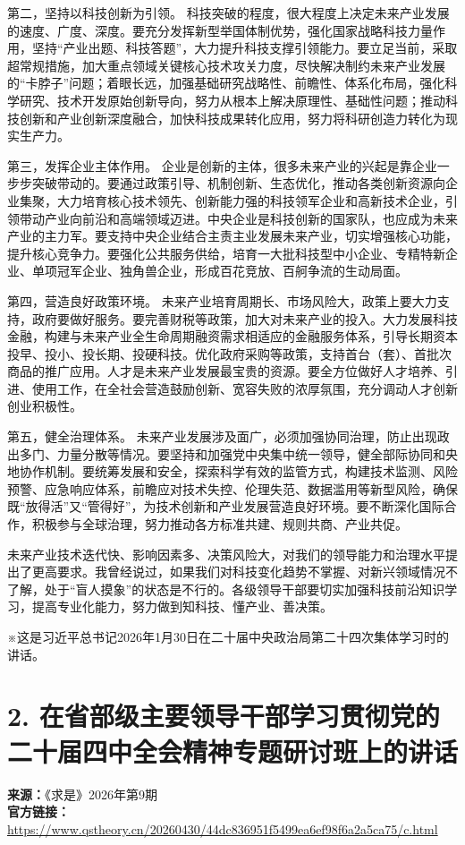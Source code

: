 \documentclass[UTF8,zihao=-4]{ctexart}
\begin{document}
第二，坚持以科技创新为引领。 科技突破的程度，很大程度上决定未来产业发展的速度、广度、深度。要充分发挥新型举国体制优势，强化国家战略科技力量作用，坚持“产业出题、科技答题”，大力提升科技支撑引领能力。要立足当前，采取超常规措施，加大重点领域关键核心技术攻关力度，尽快解决制约未来产业发展的“卡脖子”问题；着眼长远，加强基础研究战略性、前瞻性、体系化布局，强化科学研究、技术开发原始创新导向，努力从根本上解决原理性、基础性问题；推动科技创新和产业创新深度融合，加快科技成果转化应用，努力将科研创造力转化为现实生产力。

第三，发挥企业主体作用。 企业是创新的主体，很多未来产业的兴起是靠企业一步步突破带动的。要通过政策引导、机制创新、生态优化，推动各类创新资源向企业集聚，大力培育核心技术领先、创新能力强的科技领军企业和高新技术企业，引领带动产业向前沿和高端领域迈进。中央企业是科技创新的国家队，也应成为未来产业的主力军。要支持中央企业结合主责主业发展未来产业，切实增强核心功能，提升核心竞争力。要强化公共服务供给，培育一大批科技型中小企业、专精特新企业、单项冠军企业、独角兽企业，形成百花竞放、百舸争流的生动局面。

第四，营造良好政策环境。 未来产业培育周期长、市场风险大，政策上要大力支持，政府要做好服务。要完善财税等政策，加大对未来产业的投入。大力发展科技金融，构建与未来产业全生命周期融资需求相适应的金融服务体系，引导长期资本投早、投小、投长期、投硬科技。优化政府采购等政策，支持首台（套）、首批次商品的推广应用。人才是未来产业发展最宝贵的资源。要全方位做好人才培养、引进、使用工作，在全社会营造鼓励创新、宽容失败的浓厚氛围，充分调动人才创新创业积极性。

第五，健全治理体系。 未来产业发展涉及面广，必须加强协同治理，防止出现政出多门、力量分散等情况。要坚持和加强党中央集中统一领导，健全部际协同和央地协作机制。要统筹发展和安全，探索科学有效的监管方式，构建技术监测、风险预警、应急响应体系，前瞻应对技术失控、伦理失范、数据滥用等新型风险，确保既“放得活”又“管得好”，为技术创新和产业发展营造良好环境。要不断深化国际合作，积极参与全球治理，努力推动各方标准共建、规则共商、产业共促。

未来产业技术迭代快、影响因素多、决策风险大，对我们的领导能力和治理水平提出了更高要求。我曾经说过，如果我们对科技变化趋势不掌握、对新兴领域情况不了解，处于“盲人摸象”的状态是不行的。各级领导干部要切实加强科技前沿知识学习，提高专业化能力，努力做到知科技、懂产业、善决策。

※这是习近平总书记2026年1月30日在二十届中央政治局第二十四次集体学习时的讲话。

\clearpage
\section*{2. 在省部级主要领导干部学习贯彻党的二十届四中全会精神专题研讨班上的讲话}
\noindent\textbf{来源：}《求是》2026年第9期\\
\noindent\textbf{官方链接：}
\noindent\url{https://www.qstheory.cn/20260430/44dc836951f5499ea6ef98f6a2a5ca75/c.html}
\end{document}
